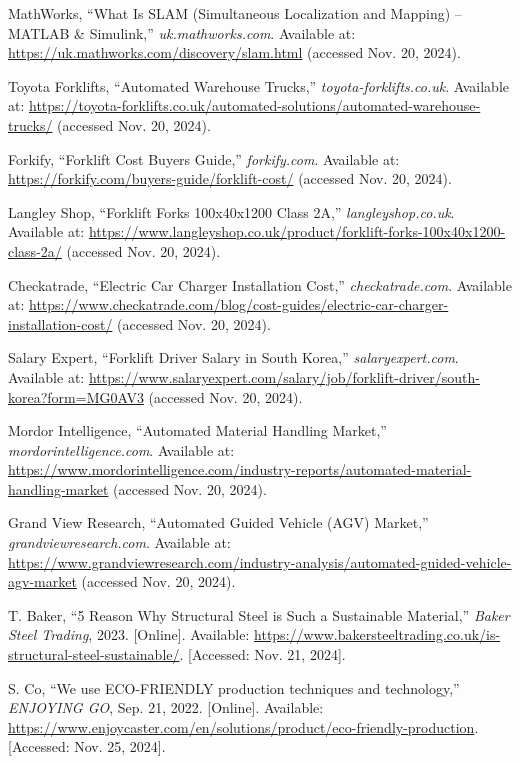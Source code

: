 \documentclass[12pt]{article}
\begin{document}
\begin{thebibliography}{99}

MathWorks, “What Is SLAM (Simultaneous Localization and Mapping) – MATLAB \& Simulink,” \textit{uk.mathworks.com}.  
Available at: \url{https://uk.mathworks.com/discovery/slam.html} (accessed Nov. 20, 2024).
 

Toyota Forklifts, “Automated Warehouse Trucks,” \textit{toyota-forklifts.co.uk}.  
Available at: \url{https://toyota-forklifts.co.uk/automated-solutions/automated-warehouse-trucks/} (accessed Nov. 20, 2024).

Forkify, “Forklift Cost Buyers Guide,” \textit{forkify.com}.  
Available at: \url{https://forkify.com/buyers-guide/forklift-cost/} (accessed Nov. 20, 2024).


Langley Shop, “Forklift Forks 100x40x1200 Class 2A,” \textit{langleyshop.co.uk}.  
Available at: \url{https://www.langleyshop.co.uk/product/forklift-forks-100x40x1200-class-2a/} (accessed Nov. 20, 2024).

Checkatrade, “Electric Car Charger Installation Cost,” \textit{checkatrade.com}.  
Available at: \url{https://www.checkatrade.com/blog/cost-guides/electric-car-charger-installation-cost/} (accessed Nov. 20, 2024).

Salary Expert, “Forklift Driver Salary in South Korea,” \textit{salaryexpert.com}.  
Available at: \url{https://www.salaryexpert.com/salary/job/forklift-driver/south-korea?form=MG0AV3} (accessed Nov. 20, 2024).

Mordor Intelligence, “Automated Material Handling Market,” \textit{mordorintelligence.com}.  
Available at: \url{https://www.mordorintelligence.com/industry-reports/automated-material-handling-market} (accessed Nov. 20, 2024).

Grand View Research, “Automated Guided Vehicle (AGV) Market,” \textit{grandviewresearch.com}.  
Available at: \url{https://www.grandviewresearch.com/industry-analysis/automated-guided-vehicle-agv-market} (accessed Nov. 20, 2024).

 T. Baker, ``5 Reason Why Structural Steel is Such a Sustainable Material,'' \textit{Baker Steel Trading}, 2023. [Online]. Available: \url{https://www.bakersteeltrading.co.uk/is-structural-steel-sustainable/}. [Accessed: Nov. 21, 2024].

 S. Co, ``We use ECO-FRIENDLY production techniques and technology,'' \textit{ENJOYING GO}, Sep. 21, 2022. [Online]. Available: \url{https://www.enjoycaster.com/en/solutions/product/eco-friendly-production}. [Accessed: Nov. 25, 2024].


\end{thebibliography}
\end{document}
